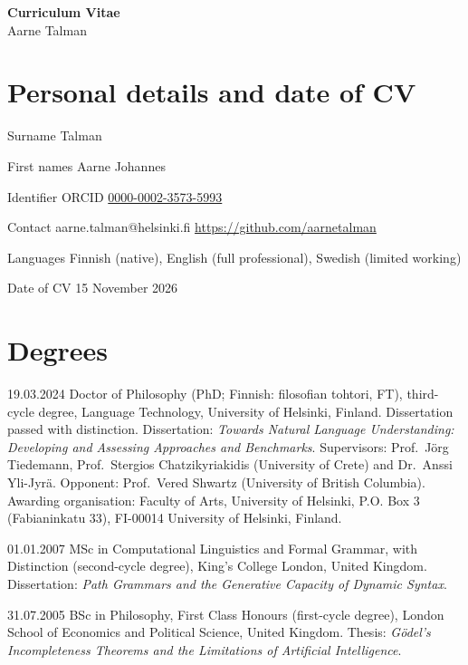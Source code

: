 \documentclass[12pt,a4paper]{article}
\newenvironment{entries}{%
  \begin{list}{}{%
    \setlength{\labelwidth}{2.7cm}%
    \setlength{\labelsep}{0.3cm}%
    \setlength{\leftmargin}{3.0cm}%
    \setlength{\itemsep}{2pt}%
    \setlength{\parsep}{0pt}%
    \setlength{\topsep}{1pt}%
    \renewcommand{\makelabel}[1]{##1\hfil}}}%
  {\end{list}}
\begin{document}
\begin{center}
  {\Large\bfseries Curriculum Vitae}\\[2pt]
  {\large Aarne Talman}
\end{center}

\section{Personal details and date of CV}
\begin{entries}
  \item[Surname] Talman
  \item[First names] Aarne Johannes
  \item[Identifier] ORCID \href{https://orcid.org/0000-0002-3573-5993}{0000-0002-3573-5993}
  \item[Contact] aarne.talman@helsinki.fi \quad \url{https://github.com/aarnetalman}
  \item[Languages] Finnish (native), English (full professional), Swedish (limited working)
  \item[Date of CV] 15 November 2026
\end{entries}

\section{Degrees}
\begin{entries}
  \item[19.03.2024] Doctor of Philosophy (PhD; Finnish: filosofian tohtori, FT), third-cycle degree, Language Technology, University of Helsinki, Finland. Dissertation passed with distinction. Dissertation: \emph{Towards Natural Language Understanding: Developing and Assessing Approaches and Benchmarks}. Supervisors: Prof.\ Jörg Tiedemann, Prof.\ Stergios Chatzikyriakidis (University of Crete) and Dr.\ Anssi Yli-Jyrä. Opponent: Prof.\ Vered Shwartz (University of British Columbia).\\
  Awarding organisation: Faculty of Arts, University of Helsinki, P.O. Box 3 (Fabianinkatu 33), FI-00014 University of Helsinki, Finland.
  \item[01.01.2007] MSc in Computational Linguistics and Formal Grammar, with Distinction (second-cycle degree), King's College London, United Kingdom. Dissertation: \emph{Path Grammars and the Generative Capacity of Dynamic Syntax}.
  \item[31.07.2005] BSc in Philosophy, First Class Honours (first-cycle degree), London School of Economics and Political Science, United Kingdom. Thesis: \emph{Gödel's Incompleteness Theorems and the Limitations of Artificial Intelligence}.
\end{entries}
\end{document}
